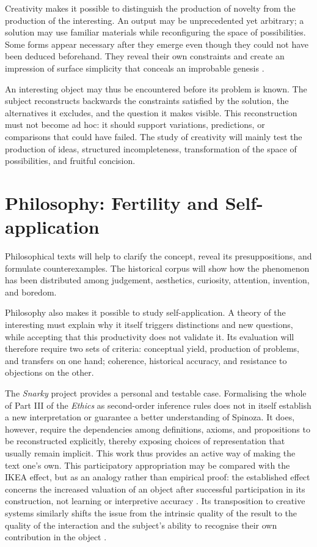 \documentclass[11pt,a4paper]{article}
\begin{document}
Creativity makes it possible to distinguish the production of novelty from the
production of the interesting. An output may be unprecedented yet arbitrary; a
solution may use familiar materials while reconfiguring the space of
possibilities. Some forms appear necessary after they emerge even though they
could not have been deduced beforehand. They reveal their own constraints and
create an impression of surface simplicity that conceals an improbable genesis
\parencite{pachet2026impossibilite,pachet2027virtuosite}.

An interesting object may thus be encountered before its problem is known. The
subject reconstructs backwards the constraints satisfied by the solution, the
alternatives it excludes, and the question it makes visible. This reconstruction
must not become ad hoc: it should support variations, predictions, or
comparisons that could have failed. The study of creativity will mainly test the
production of ideas, structured incompleteness, transformation of the space of
possibilities, and fruitful concision.

\section{Philosophy: Fertility and Self-application}

Philosophical texts will help to clarify the concept, reveal its presuppositions,
and formulate counterexamples.
The historical corpus will show how the phenomenon has been distributed among
judgement, aesthetics, curiosity, attention, invention, and boredom.

Philosophy also makes it possible to study self-application. A theory of the interesting
must explain why it itself triggers distinctions and new questions, while accepting
that this productivity does not validate it. Its evaluation will therefore
require two sets of criteria: conceptual yield, production of problems, and
transfers on one hand; coherence, historical accuracy, and resistance to
objections on the other.

The \emph{Snarky} project provides a personal and testable case. Formalising the
whole of Part III of the \emph{Ethics} as second-order inference rules does not
in itself establish a new interpretation or guarantee a better understanding of
Spinoza. It does, however, require the dependencies among definitions, axioms,
and propositions to be reconstructed explicitly, thereby exposing choices of
representation that usually remain implicit. This work thus provides an active
way of making the text one's own. This participatory appropriation may be
compared with the IKEA effect, but as an analogy rather than empirical proof:
the established effect concerns the increased valuation of an object after
successful participation in its construction, not learning or interpretive
accuracy \parencite{norton2012ikea}. Its transposition to creative systems
similarly shifts the issue from the intrinsic quality of the result to the
quality of the interaction and the subject's ability to recognise their own
contribution in the object \parencite[152--153]{pachet2026generation}.
\end{document}
